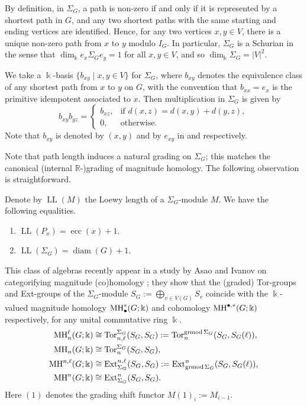 \documentclass[a4paper,leqno]{amsart}
\begin{document}
By definition, in $\Sigma_G$, a path is non-zero if and only if it is represented by a shortest path in $G$, and any two shortest paths with the same starting and ending vertices are identified. Hence, for any two vertices $x,y\in V$, there is a unique non-zero path from $x$ to $y$ modulo $I_G$. 
In particular, $\Sigma_G$ is a Schurian in the sense that 
$\dim_{\Bbbk} e_x\Sigma_Ge_y=1$ for all $x,y\in V$, and so $\dim_{\Bbbk} \Sigma_G=|V|^2$. 


We take a $\Bbbk$-basis $\{b_{xy}\mid x,y\in V\}$ for $\Sigma_G$,
where $b_{xy}$ denotes the equivalence class of any shortest path from $x$ to $y$ on $G$, with the convention that $b_{xx}=e_x$ is the primitive idempotent associated to $x$. Then multiplication in $\Sigma_G$ is given by
$$
b_{xy}b_{yz}=
\begin{cases}
b_{xz}, & \text{if } d(x,z)=d(x,y)+d(y,z),\\
0, & \text{otherwise}.
\end{cases}
$$
Note that $b_{xy}$ is denoted by $(x,y)$ and by $e_{xy}$ in \cite{AI24} and \cite{AW24} respectively. 

\medskip

Note that path length induces a natural grading on $\Sigma_G$; this matches the canonical (internal $\mathbb{R}$-)grading of magnitude homology.  
The following observation is straightforward.

\begin{lem}\label{lem:Loewy legnth=ecc}
Denote by $\operatorname{LL}(M)$ the Loewy length of a $\Sigma_G$-module $M$.  We have the following equalities.
\begin{enumerate}
    \item $\operatorname{LL}(P_x)=\operatorname{ecc}(x)+1$.
    \item $\operatorname{LL}(\Sigma_G)=\operatorname{diam}(G)+1$. 
\end{enumerate}
\end{lem}

This class of algebras recently appear in a study by Asao and Ivanov on categorifying magnitude (co)homology \cite[Theorem 6.2]{AI24}; they show that the (graded) Tor-groups and Ext-groups of the $\Sigma_G$-module $S_G:=\bigoplus_{v\in V(G)} S_v$ coincide with the $\Bbbk$-valued magnitude homology $\operatorname{MH}_\bullet^*(G;\Bbbk)$ and cohomology $\operatorname{MH}^{\bullet,*}(G;\Bbbk)$ respectively, for any unital commutative ring $\Bbbk$.
\begin{align*}
\operatorname{MH}_n^
\ell(G;\Bbbk) & \cong \operatorname{Tor}_{n,\ell}^{\Sigma_G}(S_G,S_G):=\operatorname{Tor}^{\operatorname{grmod}\Sigma_G}_{n}(S_G,S_G(\ell)), \\
\operatorname{MH}_n(G;\Bbbk) & \cong \operatorname{Tor}^{\Sigma_G}_{n}(S_G,S_G), \\
\operatorname{MH}^{n,\ell}(G;\Bbbk) & \cong \operatorname{Ext}^{n,\ell}_{\Sigma_G}(S_G,S_G):=\operatorname{Ext}_{\operatorname{grmod}\Sigma_G}^{n}(S_G,S_G(\ell)), \\
\operatorname{MH}^{n}(G;\Bbbk) & \cong \operatorname{Ext}_{\Sigma_G}^{n}(S_G,S_G).
\end{align*}
Here $(1)$ denotes the grading shift functor $M(1)_i := M_{i-1}$. 
\end{document}
